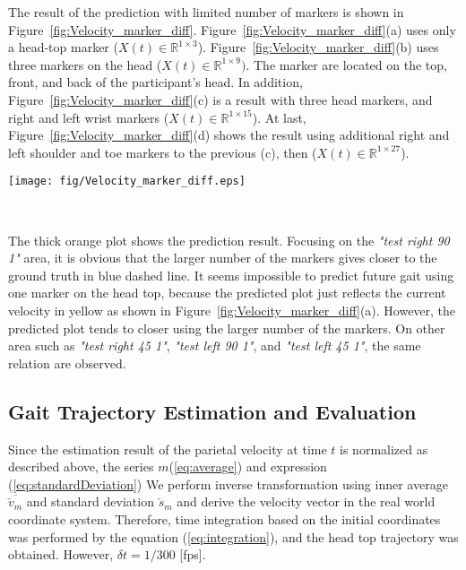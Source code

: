 \documentclass{sigchi}
\begin{document}
The result of the prediction with limited number of markers is shown in Figure~\ref{fig:Velocity_marker_diff}. 
Figure~\ref{fig:Velocity_marker_diff}(a) uses only a head-top marker ($X(t)\in\mathbb{R}^{1 \times 3} $).
Figure~\ref{fig:Velocity_marker_diff}(b) uses three markers on the head ($X(t)\in\mathbb{R}^{1 \times 9}) $. The marker are located on the top, front, and back of the participant's head. In addition, Figure~\ref{fig:Velocity_marker_diff}(c) is a result with three head markers, and right and left wrist markers ($X(t)\in\mathbb{R}^{1 \times 15} $). At last, Figure~\ref{fig:Velocity_marker_diff}(d) shows the result using additional right and left shoulder and toe markers to the previous (c), then ($X(t)\in\mathbb{R}^{1 \times 27} $).
 
\begin{figure*}
\centering
  \texttt{[image: fig/Velocity\_marker\_diff.eps]} \hspace{-15mm} 
  \caption{Prediction result with limited number of markers  ($ \Delta t $ = 0.5)}
  ~\label{fig:Velocity_marker_diff}
\end{figure*}

The thick orange plot shows the prediction result. Focusing on the \textit{"test right 90 1"} area, it is obvious that the larger number of the markers gives closer to the ground truth in blue dashed line. It seems impossible to predict future gait using one marker on the head top, because the predicted plot just reflects the current velocity in yellow as shown in Figure~\ref{fig:Velocity_marker_diff}(a). However, the predicted plot tends to closer using the larger number of the markers. On other area such as  \textit{"test right 45 1"},   \textit{"test left 90 1"}, and  \textit{"test left  45 1"}, the same relation are observed.


\subsection{Gait Trajectory Estimation and Evaluation}

Since the estimation result of the parietal velocity at time $ t $ is normalized as described above, the series $ m $(\ref {eq:average}) and expression (\ref {eq:standardDeviation}) We perform inverse transformation using inner average $ \overline {\check {v} _ {m}} $ and standard deviation $ \check {s} _ m $ and derive the velocity vector in the real world coordinate system. Therefore, time integration based on the initial coordinates was performed by the equation (\ref {eq:integration}), and the head top trajectory was obtained. However, $ \delta t = 1/300 $ [fps].
\end{document}
